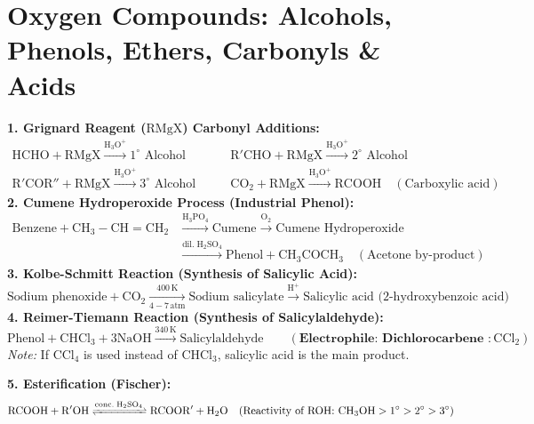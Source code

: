 \documentclass[10pt,a4paper]{article}
\begin{document}
\section{Oxygen Compounds: Alcohols, Phenols, Ethers, Carbonyls \& Acids}

\begin{formulabox}
\textbf{1. Grignard Reagent ($\mathrm{RMgX}$) Carbonyl Additions:}
\begin{align*}
  \mathrm{HCHO} + \mathrm{RMgX} \xrightarrow{\mathrm{H_3O^+}} 1^\circ \text{ Alcohol} \qquad & \mathrm{R'CHO} + \mathrm{RMgX} \xrightarrow{\mathrm{H_3O^+}} 2^\circ \text{ Alcohol}\\
  \mathrm{R'COR''} + \mathrm{RMgX} \xrightarrow{\mathrm{H_3O^+}} 3^\circ \text{ Alcohol} \qquad & \mathrm{CO_2} + \mathrm{RMgX} \xrightarrow{\mathrm{H_3O^+}} \mathrm{RCOOH} \quad (\text{Carboxylic acid})
\end{align*}
\textbf{2. Cumene Hydroperoxide Process (Industrial Phenol):}
\begin{align*}
  \text{Benzene} + \mathrm{CH_3-CH=CH_2} & \xrightarrow{\mathrm{H_3PO_4}} \text{Cumene} \xrightarrow{\mathrm{O_2}} \text{Cumene Hydroperoxide}\\
  & \xrightarrow{\mathrm{dil.\; H_2SO_4}} \text{Phenol} + \mathrm{CH_3COCH_3} \quad (\text{Acetone by-product})
\end{align*}
\textbf{3. Kolbe-Schmitt Reaction (Synthesis of Salicylic Acid):}
\begin{equation}
  \text{Sodium phenoxide} + \mathrm{CO_2} \xrightarrow[4-7\,\mathrm{atm}]{400\,\mathrm{K}} \text{Sodium salicylate} \xrightarrow{\mathrm{H}^+} \text{Salicylic acid (2-hydroxybenzoic acid)}
\end{equation}
\textbf{4. Reimer-Tiemann Reaction (Synthesis of Salicylaldehyde):}
\begin{equation}
  \text{Phenol} + \mathrm{CHCl_3} + 3\mathrm{NaOH} \xrightarrow{340\,\mathrm{K}} \text{Salicylaldehyde} \qquad (\textbf{Electrophile: Dichlorocarbene } :\mathrm{CCl}_2)
\end{equation}
\textit{Note:} If $\mathrm{CCl}_4$ is used instead of $\mathrm{CHCl}_3$, salicylic acid is the main product.

\textbf{5. Esterification (Fischer):}
\begin{equation}
  \mathrm{RCOOH} + \mathrm{R'OH} \xrightleftharpoons{\mathrm{conc.\; H_2SO_4}} \mathrm{RCOOR'} + \mathrm{H_2O} \quad (\text{Reactivity of ROH: } \mathrm{CH_3OH} > 1^\circ > 2^\circ > 3^\circ)
\end{equation}
\end{formulabox}
\end{document}
